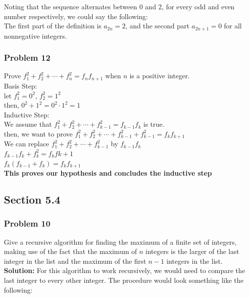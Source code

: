 \documentclass[paper=a4, fontsize=11pt]{scrartcl} %
\begin{document}
Noting that the sequence alternates between 0 and 2, for every odd and even number respectively, we could say the following:\\

The first part of the definition is $a_{2n} = 2$, and the second part $a_{2n+1} = 0$ for all nonnegative integers.\\ 
\subsubsection*{Problem 12}
Prove $f_1^2 + f_2^2 + \cdots + f_n^2 = f_nf_{n+1}$ when $n$ is a positive integer.\\

Basis Step:\\
let $f_1^2 = 0^2$, $f_2^2 = 1^2$\\
then, $0^2+1^2 = 0^2 \cdot 1^2 = 1$\\

Inductive Step:\\
We assume that $f_1^2 + f_2^2 + \cdots + f_{k-1}^2 = f_{k-1}f_{k}$ is true.\\
then, we want to prove $f_1^2 + f_2^2 + \cdots + f_{k-1}^2 + f_{k-1}^2 = f_kf_{k+1}$\\
We can replace $f_1^2 + f_2^2 + \cdots + f_{k-1}^2$ by $f_{k-1}f_{k}$\\
$f_{k-1}f_{k} + f_k^2 = f_kf{k+1}$\\
$f_k(f_{k-1}+f_k) = f_kf_{k+1}$\\
\textbf{This proves our hypothesis and concludes the inductive step} \\

\subsection*{Section 5.4}
\subsubsection*{Problem 10}
Give a recursive algorithm for finding the maximum of a finite set of integers, making use of the fact that the maximum of $n$ integers is the larger of the last integer in the list and the maximum of the first $n-1$ integers in the list.\\


\textbf{Solution:} For this algorithm to work recursively, we would need to compare the last integer to every other integer. The procedure would look something like the following:\\
\end{document}
